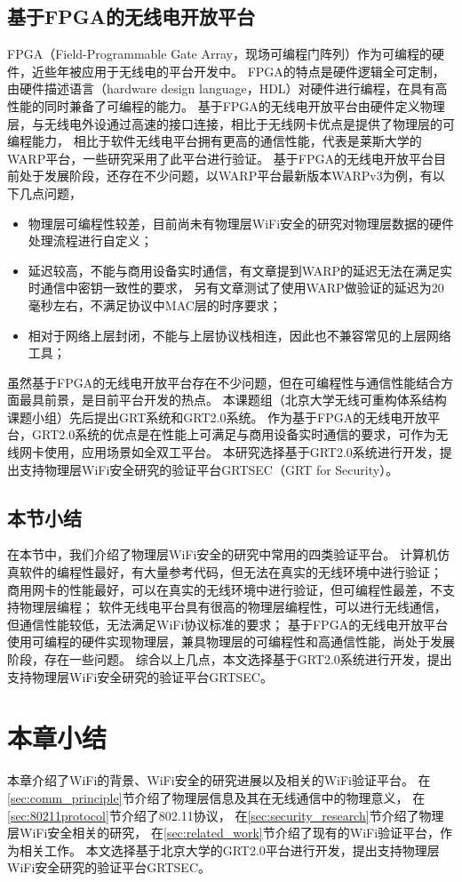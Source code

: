 		\subsection{基于FPGA的无线电开放平台}
		FPGA（Field-Programmable Gate Array，现场可编程门阵列）作为可编程的硬件，近些年被应用于无线电的平台开发中。
		FPGA的特点是硬件逻辑全可定制，由硬件描述语言（hardware design language，HDL）对硬件进行编程，在具有高性能的同时兼备了可编程的能力。
		基于FPGA的无线电开放平台由硬件定义物理层，与无线电外设通过高速的接口连接，相比于无线网卡优点是提供了物理层的可编程能力，
		相比于软件无线电平台拥有更高的通信性能，代表是莱斯大学的WARP平台\cite{warp}，一些研究\cite{mobicom13securearray, access16key}采用了此平台进行验证。
		基于FPGA的无线电开放平台目前处于发展阶段，还存在不少问题，以WARP平台最新版本WARPv3为例，有以下几点问题，
		\begin{itemize}
			\item 物理层可编程性较差，目前尚未有物理层WiFi安全的研究对物理层数据的硬件处理流程进行自定义；
			\item 延迟较高，不能与商用设备实时通信，有文章提到WARP的延迟无法在满足实时通信中密钥一致性的要求\cite{access16key}，
			另有文章测试了使用WARP做验证的延迟为20毫秒左右，不满足协议中MAC层的时序要求\cite{mobicom13securearray}；
			\item 相对于网络上层封闭，不能与上层协议栈相连，因此也不兼容常见的上层网络工具；
		\end{itemize}
		虽然基于FPGA的无线电开放平台存在不少问题，但在可编程性与通信性能结合方面最具前景，是目前平台开发的热点。
		本课题组（北京大学无线可重构体系结构课题小组\cite{pkuraw}）先后提出GRT系统\cite{can14grt}和GRT2.0系统\cite{sigda17grt}。
		作为基于FPGA的无线电开放平台，GRT2.0系统的优点是在性能上可满足与商用设备实时通信的要求，可作为无线网卡使用，应用场景如全双工平台\cite{mna16grt}。
		本研究选择基于GRT2.0系统进行开发，提出支持物理层WiFi安全研究的验证平台GRTSEC（GRT for Security）。

		\subsection{本节小结}
		在本节中，我们介绍了物理层WiFi安全的研究中常用的四类验证平台。
		计算机仿真软件的编程性最好，有大量参考代码，但无法在真实的无线环境中进行验证；
		商用网卡的性能最好，可以在真实的无线环境中进行验证，但可编程性最差，不支持物理层编程；
		软件无线电平台具有很高的物理层编程性，可以进行无线通信，但通信性能较低，无法满足WiFi协议标准的要求；
		基于FPGA的无线电开放平台使用可编程的硬件实现物理层，兼具物理层的可编程性和高通信性能，尚处于发展阶段，存在一些问题。
		综合以上几点，本文选择基于GRT2.0系统进行开发，提出支持物理层WiFi安全研究的验证平台GRTSEC。

\section{本章小结}\label{sec:chap2_conclusion}
本章介绍了WiFi的背景、WiFi安全的研究进展以及相关的WiFi验证平台。
在\ref{sec:comm_principle}节介绍了物理层信息及其在无线通信中的物理意义，
在\ref{sec:80211protocol}节介绍了802.11协议，
在\ref{sec:security_research}节介绍了物理层WiFi安全相关的研究，
在\ref{sec:related_work}节介绍了现有的WiFi验证平台，作为相关工作。
本文选择基于北京大学的GRT2.0平台进行开发，提出支持物理层WiFi安全研究的验证平台GRTSEC。
